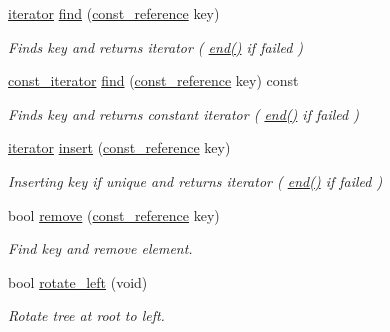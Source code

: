 \begin{DoxyCompactItemize}
\hyperlink{classcrap_1_1binary__tree_af3313f011a64bb5a945dcd39cc3fc3c3}{iterator} \hyperlink{classcrap_1_1binary__tree_ab761863e9a54a996f8d9be489c6c8108}{find} (\hyperlink{classcrap_1_1binary__tree_a0fa18b1ab1bd0759b57e95b3804cce9a}{const\-\_\-reference} key)
\begin{DoxyCompactList}\small\item\em Finds key and returns iterator ( \hyperlink{classcrap_1_1binary__tree_a6772ed25fccbde673feb71cb3212d743}{end()} if failed ) \end{DoxyCompactList}\item 
\hyperlink{classcrap_1_1binary__tree_aa9b9a8c0dd4bb6c574ea0526040e7c50}{const\-\_\-iterator} \hyperlink{classcrap_1_1binary__tree_ab6a8fdfd2596c8fb39c4f8b30f80a1eb}{find} (\hyperlink{classcrap_1_1binary__tree_a0fa18b1ab1bd0759b57e95b3804cce9a}{const\-\_\-reference} key) const 
\begin{DoxyCompactList}\small\item\em Finds key and returns constant iterator ( \hyperlink{classcrap_1_1binary__tree_a6772ed25fccbde673feb71cb3212d743}{end()} if failed ) \end{DoxyCompactList}\item 
\hyperlink{classcrap_1_1binary__tree_af3313f011a64bb5a945dcd39cc3fc3c3}{iterator} \hyperlink{classcrap_1_1binary__tree_aa3e861dc915b3275ca8ff4e44706693b}{insert} (\hyperlink{classcrap_1_1binary__tree_a0fa18b1ab1bd0759b57e95b3804cce9a}{const\-\_\-reference} key)
\begin{DoxyCompactList}\small\item\em Inserting key if unique and returns iterator ( \hyperlink{classcrap_1_1binary__tree_a6772ed25fccbde673feb71cb3212d743}{end()} if failed ) \end{DoxyCompactList}\item 
bool \hyperlink{classcrap_1_1binary__tree_a05d61199d32fba780e4f06cbd8d78dc9}{remove} (\hyperlink{classcrap_1_1binary__tree_a0fa18b1ab1bd0759b57e95b3804cce9a}{const\-\_\-reference} key)
\begin{DoxyCompactList}\small\item\em Find key and remove element. \end{DoxyCompactList}\item 
bool \hyperlink{classcrap_1_1binary__tree_a89f5b9cef4d0222a08bb8b4af36aacc1}{rotate\-\_\-left} (void)
\begin{DoxyCompactList}\small\item\em Rotate tree at root to left. \end{DoxyCompactList}\item 

\end{DoxyCompactItemize}
